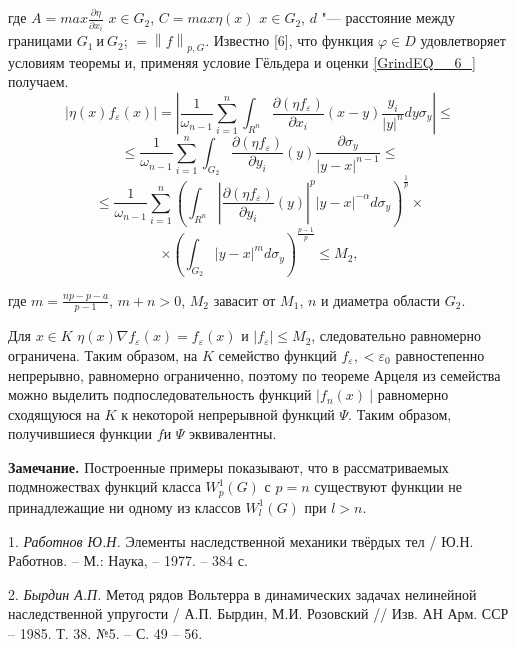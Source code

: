 где $A=max\frac{\partial \eta }{\partial x_{i} }$ $x\in G_{2}$, $C=max\eta \left(x\right)$ $x\in G_{2} $, $d$ "--- расстояние между границами
$G_1\ \mathrm{\textrm{и}}\ G_2$; $=\left\| f\right\| _{p,G} $. Известно [6], что функция $\varphi \in D$ удовлетворяет условиям теоремы и, применяя условие Гёльдера и оценки \ref{GrindEQ__6_} получаем.
$$
\left|\eta \left(x\right)f_{\varepsilon } \left(x\right)\right|=\left|\frac{1}{\omega _{n-1} } \sum _{i=1}^{n}\int _{R^{n} }\frac{\partial \left(\eta f_{\varepsilon } \right)}{\partial x_{i} } \left(x-y\right)\frac{y_{i} }{\left|y\right|^{n} } dy\sigma _{y}   \right|\leqslant
$$
$$
\leqslant\frac{1}{\omega _{n-1} } \sum _{i=1}^{n}\int _{G_{2} }\frac{\partial \left(\eta f_{\varepsilon } \right)}{\partial y_{i} } \left(y\right)\frac{\partial \sigma _{y} }{\left|y-x\right|^{n-1} }\leqslant
$$
$$
\leqslant \frac{1}{\omega _{n-1} } \sum _{i=1}^{n}\left(\int _{R^{n} }\left|\frac{\partial \left(\eta f_{\varepsilon } \right)}{\partial y_{i} } \left(y\right)\right|^{p} \left|y-x\right|^{-\alpha } d\sigma _{y}  \right) ^{\frac{1}{p} } \times
$$
$$
\times\left(\int _{G_{2} }\left|y-x\right|^{m} d\sigma _{y}  \right)^{\frac{p-1}{p} } \leqslant M_{2},
$$

\noindent где $m=\frac{np-p-a}{p-1}$, $m+n>0$, $M_2$ завасит от $M_1$, $n$ и диаметра области $G_2$.

Для $x\in K$ $\eta (x)\nabla f_{\varepsilon } (x)=f_{\varepsilon } (x)$ и $|f_{\varepsilon } |\leqslant M_{2} $, следовательно равномерно ограничена.
Таким образом, на $K$ семейство функций $f_{\varepsilon } ,<\varepsilon _{0} $ равностепенно непрерывно, равномерно ограниченно,
поэтому по теореме Арцеля из семейства можно выделить подпоследовательность функций $\left|f_n(x)\ \right|$ равномерно сходящуюся на $K$ к некоторой непрерывной функций $\Psi $.
Таким образом, получившиеся функции $f$и $\Psi $ эквивалентны.

\textbf{Замечание.} Построенные примеры показывают, что в рассматриваемых подмножествах функций класса $W^1_p(G)$ с $p=n$
существуют функции не принадлежащие ни одному из классов $W^1_l\left(G\right)$ при $l>n$.


\litlist

1. {\it Работнов Ю.Н.} Элементы наследственной механики твёрдых тел / Ю.Н. Работнов. – М.: Наука, – 1977. – 384 с.

2. {\it Бырдин А.П.} Метод рядов Вольтерра в динамических задачах  нелинейной наследственной упругости /  А.П. Бырдин, М.И. Розовский // Изв. АН Арм. ССР – 1985. Т. 38. №5. – С. 49 – 56. 
